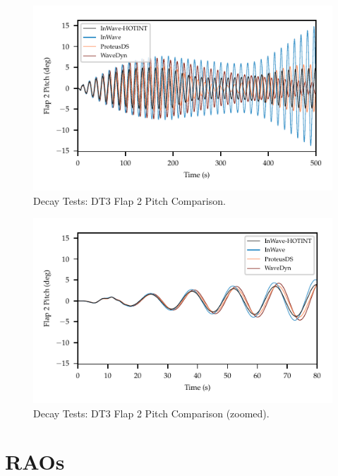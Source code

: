 \documentclass[11pt]{article}
\begin{document}
\begin{figure}[htbp]
\centering
\includegraphics[width=.9\linewidth]{images/dt/DT3_FLAP2.pdf}
\caption{Decay Tests: DT3 Flap 2 Pitch Comparison.}
\end{figure}

\begin{figure}[htbp]
\centering
\includegraphics[width=.9\linewidth]{images/dtzoom/DT3_FLAP2.pdf}
\caption{Decay Tests: DT3 Flap 2 Pitch Comparison (zoomed).}
\end{figure}



\clearpage
\section{RAOs}
\label{sec:orgd3c8058}
\end{document}
